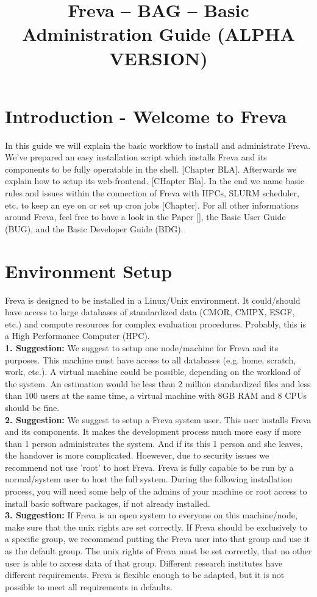 \documentclass[a4paper,11pt]{ltxdoc}
\title{Freva -- BAG -- Basic Administration Guide (ALPHA VERSION)}
\begin{document}
\maketitle

\section{Introduction - Welcome to Freva}
In this guide we will explain the basic workflow to install and administrate Freva. We've prepared an easy installation script which installs Freva and its components to be fully operatable in the shell. [Chapter BLA]. Afterwards we explain how to setup its web-frontend. [CHapter Bla]. In the end we name basic rules and issues within the connection of Freva with HPCs, SLURM scheduler, etc. to keep an eye on or set up cron jobs [Chapter]. For all other informations around Freva, feel free to have a look in the Paper [], the Basic User Guide (BUG), and the Basic Developer Guide (BDG).

\section{Environment Setup}
Freva is designed to be installed in a Linux/Unix environment. It could/should have access to large databases of standardized data (CMOR, CMIPX, ESGF, etc.) and compute resources for complex evaluation procedures. Probably, this is a High Performance Computer (HPC). \\
\textbf{1. Suggestion:} We suggest to setup one node/machine for Freva and its purposes. This machine must have access to all databases (e.g. home, scratch, work, etc.). A virtual machine could be possible, depending on the workload of the system. An estimation would be less than 2 million standardized files and less than 100 users at the same time, a virtual machine with 8GB RAM and 8 CPUs should be fine. \\
\textbf{2. Suggestion:} We suggest to setup a Freva system user. This user installs Freva and its components. It makes the development process much more easy if more than 1 person administrates the system. And if its this 1 person and she leaves, the handover is more complicated. Hoewever, due to security issues we recommend not use 'root' to host Freva. Freva is fully capable to be run by a normal/system user to host the full system. During the following installation process, you will need some help of the admins of your machine or root access to install basic software packages, if not already installed. \\
\textbf{3. Suggestion:} If Freva is an open system to everyone on this machine/node, make sure that the unix rights are set correctly. If Freva should be exclusively to a specific group, we recommend putting the Freva user into that group and use it as the default group. The unix rights of Freva must be set correctly, that no other user is able to access data of that group. Different research institutes have different requirements. Freva is flexible enough to be adapted, but it is not possible to meet all requirements in defaults.
\end{document}
